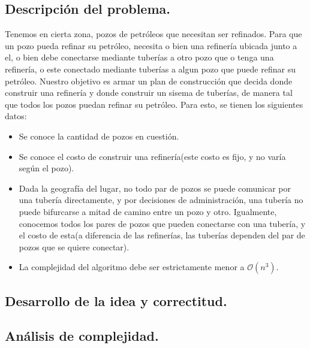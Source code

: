 \subsection{Descripción del problema.}

\vspace*{0.3cm}

Tenemos en cierta zona, pozos de petróleos que necesitan ser refinados. Para que un pozo pueda refinar su petróleo, necesita o bien una refinería ubicada junto a el, o bien debe conectarse mediante tuberías a otro pozo que o tenga una refinería, o este conectado mediante tuberías a algun pozo que puede refinar su petróleo. Nuestro objetivo es armar un plan de construcción que decida donde construir una refinería y donde construir un sisema de tuberías, de manera tal que todos los pozos puedan refinar su petróleo. Para esto, se tienen los siguientes datos:

\begin{itemize}

	\item Se conoce la cantidad de pozos en cuestión.
	\item Se conoce el costo de construir una refinería(este costo es fijo, y no varía según el pozo).
	\item Dada la geografía del lugar, no todo par de pozos se puede comunicar por una tubería directamente, y por decisiones de administración, una tubería no puede bifurcarse a mitad de camino entre un pozo y otro. Igualmente, conocemos todos los pares de pozos que pueden conectarse con una tubería, y el costo de esta(a diferencia de las refinerías, las tuberías dependen del par de pozos que se quiere conectar).
	\item La complejidad del algoritmo debe ser estrictamente menor a $\mathcal{O}(n^3)$.
	
	
\end{itemize}

\vspace*{0.6cm}

\subsection{Desarrollo de la idea y correctitud.}





\subsection{Análisis de complejidad.}


